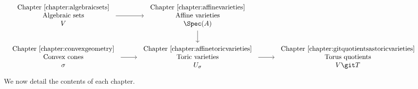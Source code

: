 \documentclass[12pt]{amsart}
\theoremstyle{plain}
\begin{document}
\[\begin{tikzcd}
	\begin{array}{c} \text{Chapter \ref{chapter:algebraicsets}} \\ \text{Algebraic sets} \\ V \end{array} & \begin{array}{c} \text{Chapter \ref{chapter:affinevarieties}} \\ \text{Affine varieties} \\ \Spec(A) \end{array} \\
	\begin{array}{c} \text{Chapter \ref{chapter:convexgeometry}} \\ \text{Convex cones} \\ \sigma \end{array} & \begin{array}{c} \text{Chapter \ref{chapter:affinetoricvarieties}} \\ \text{Toric varieties} \\ U_\sigma \end{array} & \begin{array}{c} \text{Chapter \ref{chapter:gitquotientsastoricvarieties}} \\ \text{Torus quotients} \\ V \git T \end{array}
	\arrow[from=1-1, to=1-2]
	\arrow[from=1-2, to=2-2]
	\arrow[from=2-1, to=2-2]
	\arrow[from=2-2, to=2-3]
\end{tikzcd}\]
\noindent
We now detail the contents of each chapter.
\end{document}
